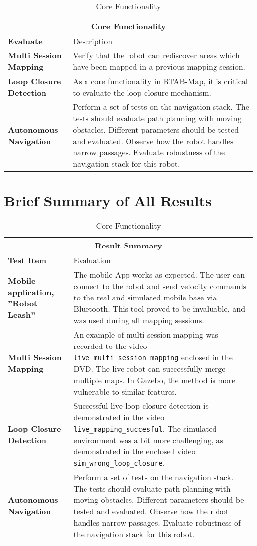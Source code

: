 \begin{table}
	\centering
	\begin{tabular}{ p{2.5cm} | p{7cm} }
	\multicolumn{2}{c}{Core Functionality}\\
\hline
	\textbf{Evaluate} & Description\\
	\hline
	\textbf{Multi Session Mapping} & Verify that the robot can rediscover areas which have been mapped in a previous mapping session.\\
	\hline
	\textbf{Loop Closure Detection} & As a core functionality in \ac{RTAB-Map}, it is critical to evaluate the loop closure mechanism.\\
	\hline
	\textbf{Autonomous Navigation} & Perform a set of tests on the navigation stack. The tests should evaluate path planning with moving obstacles. Different parameters should be tested and evaluated. Observe how the robot handles narrow passages. Evaluate robustness of the navigation stack for this robot.\\
	\hline
	\end{tabular}
	\caption{Core Functionality}\label{tab:main_func}
\end{table}

\section{Brief Summary of All Results}

\begin{table}
	\centering
	\begin{tabular}{ p{2.5cm} | p{7cm} }
		\multicolumn{2}{c}{Result Summary}\\
		\hline
		\textbf{Test Item} & Evaluation\\
		\hline
		\textbf{Mobile application, ''Robot Leash''} & The mobile App works as expected. The user can connect to the robot and send velocity commands to the real and simulated mobile base via Bluetooth. This tool proved to be invaluable, and was used during all mapping sessions.\\
		\textbf{Multi Session Mapping} & An example of multi session mapping was recorded to the video \texttt{live\_multi\_session\_mapping} enclosed in the DVD. The live robot can successfully merge multiple maps. In Gazebo, the method is more vulnerable to similar features.\\
		\hline
		\textbf{Loop Closure Detection} & Successful live loop closure detection is demonstrated in the video \texttt{live\_mapping\_succesful}. The simulated environment was a bit more challenging, as demonstrated in the enclosed video \texttt{sim\_wrong\_loop\_closure}.\\
		\hline
		\textbf{Autonomous Navigation} & Perform a set of tests on the navigation stack. The tests should evaluate path planning with moving obstacles. Different parameters should be tested and evaluated. Observe how the robot handles narrow passages. Evaluate robustness of the navigation stack for this robot.\\
		\hline
	\end{tabular}
	\caption{Core Functionality}\label{tab:main_func}
\end{table}

